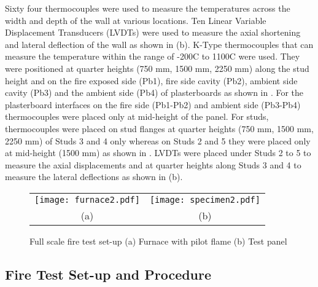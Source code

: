 Sixty four thermocouples were used to measure the temperatures across the width and depth of the wall at various locations. Ten Linear Variable Displacement Transducers (LVDTs) were used to measure the axial shortening and lateral deflection of the wall as shown in  (b). K-Type thermocouples that can measure the temperature within the range of -200\degree C to 1100\degree C were used. They were positioned at quarter heights (750 mm, 1500 mm, 2250 mm) along the stud height and on the fire exposed side (Pb1), fire side cavity (Pb2), ambient side cavity (Pb3) and the ambient side (Pb4) of plasterboards as shown in . For the plasterboard interfaces on the fire side (Pb1-Pb2) and ambient side (Pb3-Pb4) thermocouples were placed only at mid-height of the panel. For studs, thermocouples were placed on stud flanges at quarter heights (750 mm, 1500 mm, 2250 mm) of Studs 3 and 4 only whereas on Studs 2 and 5 they were placed only at mid-height (1500 mm) as shown in . LVDTs were placed under Studs 2 to 5 to measure the axial displacements and at quarter heights along Studs 3 and 4 to measure the lateral deflections as shown in (b).
\begin{figure}[!htbp]
	\centering
		\begin{tabular}{cc}
		\texttt{[image: furnace2.pdf]} &
		\texttt{[image: specimen2.pdf]}\\
		(a) & (b)  \\ 
		\end{tabular} 
		\caption{Full scale fire test set-up (a) Furnace with pilot flame (b) Test panel}
		\label{fig:furnace-specimen}
\end{figure}

\subsection{Fire Test Set-up and Procedure}

